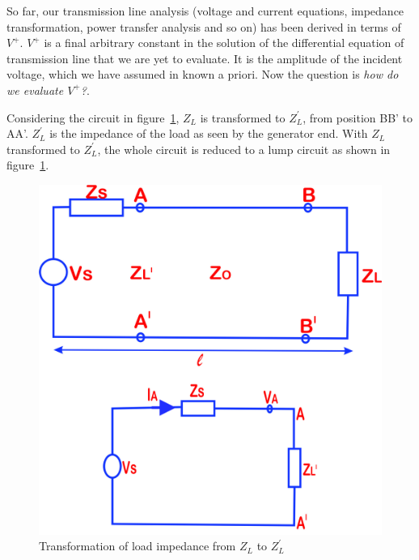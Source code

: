 So far, our transmission line analysis (voltage and current equations, impedance transformation, power transfer analysis and so on) has been derived in terms of $V^+$. $V^+$ is a final arbitrary constant in the solution of the differential equation of transmission line that we are yet to evaluate. It is the amplitude of the incident voltage, which we have assumed in known a priori. Now the question is \emph{how do we evaluate $V^{+}$?}.

Considering the circuit in figure~\ref{fig:qwerrtt}, $Z_L$ is transformed to $Z^{'}_L$, from position BB' to AA'. $Z^{'}_L$ is the impedance of the load as seen by the generator end. With $Z_L$ transformed to $Z^{'}_L$, the whole circuit is reduced to a lump circuit as shown in figure~\ref{fig:qwerrtt}.
\begin{figure}[h]
\centering
\includegraphics[width=0.7\linewidth]{./graphics/qwerrtt fixed}
\caption{Transformation of load impedance from $Z_L$ to $Z_{L}^'$}
\label{fig:qwerrtt}
\end{figure}

